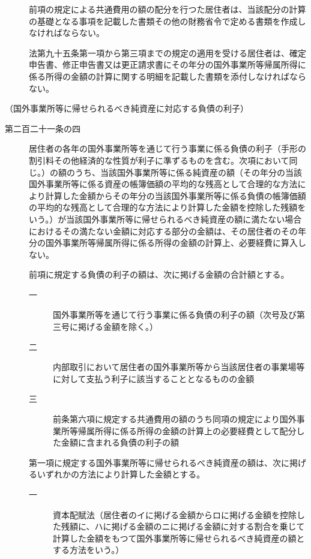 \documentclass[twocolumn,a4j,10pt]{ltjtarticle}
\begin{document}
\begin{description}
\item[]前項の規定による共通費用の額の配分を行つた居住者は、当該配分の計算の基礎となる事項を記載した書類その他の財務省令で定める書類を作成しなければならない。
\item[]法第九十五条第一項から第三項までの規定の適用を受ける居住者は、確定申告書、修正申告書又は更正請求書にその年分の国外事業所等帰属所得に係る所得の金額の計算に関する明細を記載した書類を添付しなければならない。
\end{description}
\noindent\hspace{10pt}（国外事業所等に帰せられるべき純資産に対応する負債の利子）
\begin{description}
\item[第二百二十一条の四]居住者の各年の国外事業所等を通じて行う事業に係る負債の利子（手形の割引料その他経済的な性質が利子に準ずるものを含む。次項において同じ。）の額のうち、当該国外事業所等に係る純資産の額（その年分の当該国外事業所等に係る資産の帳簿価額の平均的な残高として合理的な方法により計算した金額からその年分の当該国外事業所等に係る負債の帳簿価額の平均的な残高として合理的な方法により計算した金額を控除した残額をいう。）が当該国外事業所等に帰せられるべき純資産の額に満たない場合におけるその満たない金額に対応する部分の金額は、その居住者のその年分の国外事業所等帰属所得に係る所得の金額の計算上、必要経費に算入しない。
\item[]前項に規定する負債の利子の額は、次に掲げる金額の合計額とする。
\begin{description}
\item[一]国外事業所等を通じて行う事業に係る負債の利子の額（次号及び第三号に掲げる金額を除く。）
\item[二]内部取引において居住者の国外事業所等から当該居住者の事業場等に対して支払う利子に該当することとなるものの金額
\item[三]前条第六項に規定する共通費用の額のうち同項の規定により国外事業所等帰属所得に係る所得の金額の計算上の必要経費として配分した金額に含まれる負債の利子の額
\end{description}
\item[]第一項に規定する国外事業所等に帰せられるべき純資産の額は、次に掲げるいずれかの方法により計算した金額とする。
\begin{description}
\item[一]資本配賦法（居住者のイに掲げる金額からロに掲げる金額を控除した残額に、ハに掲げる金額のニに掲げる金額に対する割合を乗じて計算した金額をもつて国外事業所等に帰せられるべき純資産の額とする方法をいう。）
\begin{description}

\end{description}
\end{description}
\end{description}
\end{document}
